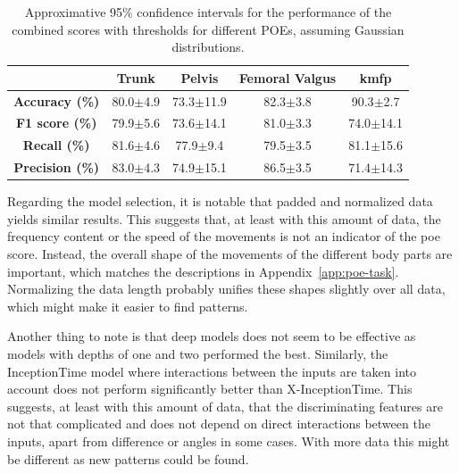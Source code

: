 \begin{table}[h]
  \caption{Approximative 95\% confidence intervals for the performance of the combined scores with thresholds for different POEs, assuming Gaussian distributions. }
  \label{tab:sum-ci}
  \centering
  \begin{tabu}[c]{|c|c|c|c|c|}
    \hline
    & \textbf{Trunk} & \textbf{Pelvis} &\textbf{Femoral Valgus} & \textbf{\gls{kmfp}} \\ \hline
    \textbf{Accuracy (\%)}  & 80.0$\pm$4.9 & 73.3$\pm$11.9 & 82.3$\pm$3.8 & 90.3$\pm$2.7 \\\hline
    \textbf{F1 score (\%)}  & 79.9$\pm$5.6 & 73.6$\pm$14.1 & 81.0$\pm$3.3 & 74.0$\pm$14.1 \\ \hline
    \textbf{Recall (\%)}    & 81.6$\pm$4.6 & 77.9$\pm$9.4  & 79.5$\pm$3.5 & 81.1$\pm$15.6 \\ \hline
    \textbf{Precision (\%)} & 83.0$\pm$4.3 & 74.9$\pm$15.1 & 86.5$\pm$3.5 & 71.4$\pm$14.3 \\\hline
  \end{tabu}
\end{table}

Regarding the model selection, it is notable that padded and normalized data yields similar results. This suggests that, at least with this amount of data, the frequency content or the speed of the movements is not an indicator of the \gls{poe} score. Instead, the overall shape of the movements of the different body parts are important, which matches the descriptions in Appendix~\ref{app:poe-task}. Normalizing the data length probably unifies these shapes slightly over all data, which might make it easier to find patterns.

Another thing to note is that deep models does not seem to be effective as models with depths of one and two performed the best. Similarly, the InceptionTime model where interactions between the inputs are taken into account does not perform significantly better than X-InceptionTime. This suggests, at least with this amount of data, that the discriminating features are not that complicated and does not depend on direct interactions between the inputs, apart from difference or angles in some cases. With more data this might be different as new patterns could be found.
